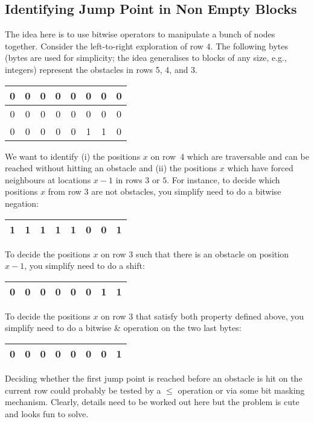 \subsection{Identifying Jump Point in Non Empty Blocks}
The idea here is to use bitwise operators
to manipulate a bunch of nodes together.  
Consider the left-to-right exploration of row $4$.  
The following bytes (bytes are used for simplicity; 
the idea generalises to blocks of any size, e.g., integers) 
represent the obstacles in rows 5, 4, and 3.  

\begin{center}
  \begin{tabular}{|c|c|c|c|c|c|c|c|}
    \hline
    0 & 0 & 0 & 0 & 0 & 0 & 0 & 0 \\
    \hline
    0 & 0 & 0 & 0 & 0 & 0 & 0 & 0 \\
    \hline
    0 & 0 & 0 & 0 & 0 & 1 & 1 & 0 \\
    \hline
  \end{tabular}
\end{center}

We want to identify (i) the positions $x$ on row~4 which are traversable and can
be reached without hitting an obstacle and (ii) the positions $x$ which have
forced neighbours at locations $x-1$ in rows $3$ or $5$.
For instance, to decide which positions $x$ from row 3 
are not obstacles, you simplify need to do a bitwise negation: 
\begin{center}
  \begin{tabular}{|c|c|c|c|c|c|c|c|}
    \hline
    1 & 1 & 1 & 1 & 1 & 0 & 0 & 1 \\
    \hline
  \end{tabular}
\end{center}
To decide the positions $x$ on row 3 
such that there is an obstacle on position $x-1$, 
you simplify need to do a shift: 
\begin{center}
  \begin{tabular}{|c|c|c|c|c|c|c|c|}
    \hline
    0 & 0 & 0 & 0 & 0 & 0 & 1 & 1 \\
    \hline
  \end{tabular}
\end{center}
To decide the positions $x$ on row 3 
that satisfy both property defined above, 
you simplify need to do a bitwise \& operation 
on the two last bytes: 
\begin{center}
  \begin{tabular}{|c|c|c|c|c|c|c|c|}
    \hline
    0 & 0 & 0 & 0 & 0 & 0 & 0 & 1 \\
    \hline
  \end{tabular}
\end{center}

Deciding whether the first jump point is  reached
before an obstacle is hit on the current row 
could probably be tested by a $\le$ operation or via
some bit masking mechanism.
Clearly, details need to be worked out here but the problem
is cute and looks fun to solve.
